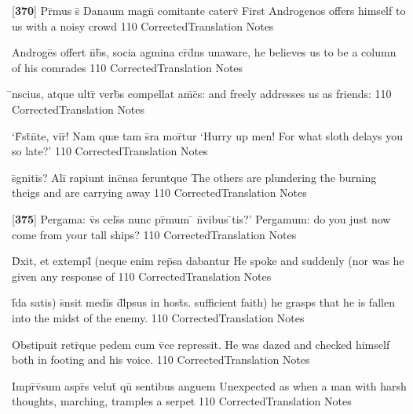 \latline
  {[\textbf{370}] Pr\={\macron {\i}}mus s\={} Danaum magn\={} comitante caterv\={}}
  { First Androgenos offers himself to us with a noisy crowd }
  {110}
  { CorrectedTranslation }
  { Notes }


\latline
  {Androge\={}s offert n\={}b\={\macron {\i}}s, socia agmina cr\={}d\={}ns}
  { unaware, he believes us to be a column of his comrades }
  {110}
  { CorrectedTranslation }
  { Notes }


\latline
  {\={\macron {\i}}nscius, atque ultr\={} verb\={\macron {\i}}s compellat am\={\macron {\i}}c\={\macron {\i}}s:}
  { and freely addresses us as friends: }
  {110}
  { CorrectedTranslation }
  { Notes }


\latline
  {`F\={}st\={\macron {\i}}n\={}te, vir\={\macron {\i}}!  Nam qu{\ae} tam s\={}ra mor\={}tur}
  { `Hurry up men!  For what sloth delays you so late?' }
  {110}
  { CorrectedTranslation }
  { Notes }


\latline
  {s\={}gniti\={}s?  Ali\={\macron {\i}} rapiunt inc\={}nsa feruntque}
  { The others are plundering the burning theigs and are carrying away }
  {110}
  { CorrectedTranslation }
  { Notes }


\latline
  {[\textbf{375}] Pergama:  v\={}s cels\={\macron {\i}}s nunc pr\={\macron {\i}}mum \={} n\={}vibus \={\macron {\i}}tis?'}
  { Pergamum: do you just now come from your tall ships?  }
  {110}
  { CorrectedTranslation }
  { Notes }


\latline
  {D\={\macron {\i}}xit, et extempl\={} (neque enim rep\={}sa dabantur}
  { He spoke and suddenly (nor was he given any response of  }
  {110}
  { CorrectedTranslation }
  { Notes }


\latline
  {f\={\macron {\i}}da satis) s\={}nsit medi\={}s d\={}l\={}psus in host\={\macron {\i}}s.}
  { sufficient faith) he grasps that he is fallen into the midst of the enemy. }
  {110}
  { CorrectedTranslation }
  { Notes }


\latline
  {Obstipuit retr\={}que pedem cum v\={}ce repressit.}
  { He was dazed and checked himself both in footing and his voice. }
  {110}
  { CorrectedTranslation }
  { Notes }


\latline
  {Impr\={}v\={\macron {\i}}sum aspr\={\macron {\i}}s velut\={\macron {\i}} qu\={\macron {\i}} sentibus anguem}
  { Unexpected as when a man with harsh thoughts, marching, tramples a serpet }
  {110}
  { CorrectedTranslation }
  { Notes }


